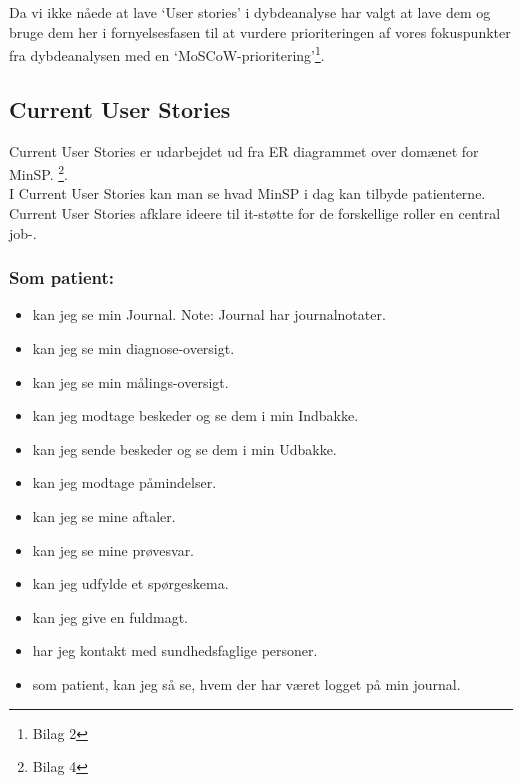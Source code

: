 %
%
%
%
%
%
%
%
%
%
%
%
%
%
%
%
%
%
%
%
%
%
%
%
%
%
Da vi ikke nåede at lave ‘User stories’ i dybdeanalyse har valgt at lave dem og bruge dem her i fornyelsesfasen til at vurdere prioriteringen af vores fokuspunkter fra dybdeanalysen med en  ‘MoSCoW-prioritering’\footnote{Bilag 2}. 
\subsection{Current User Stories} %
Current User Stories er udarbejdet ud fra ER diagrammet over domænet for MinSP. \footnote{Bilag 4}.\\ 
I Current User Stories kan man se hvad MinSP i dag kan tilbyde patienterne. Current User Stories afklare ideere til it-støtte for de forskellige roller en central job-.
\subsubsection*{Som patient:}
\begin{itemize}
\item kan jeg se min Journal. Note: Journal har journalnotater. 
\item kan jeg se min diagnose-oversigt.
\item kan jeg se min målings-oversigt.
\item kan jeg modtage beskeder og se dem i min Indbakke.
\item kan jeg sende beskeder og se dem i min Udbakke.
\item kan jeg modtage påmindelser.
\item kan jeg se mine aftaler. 
\item kan jeg se mine prøvesvar.
\item kan jeg udfylde et spørgeskema.
\item kan jeg give en fuldmagt. 
\item har jeg kontakt med sundhedsfaglige personer. 
\item som patient, kan jeg så se, hvem der har været logget på min journal.
\end{itemize}
